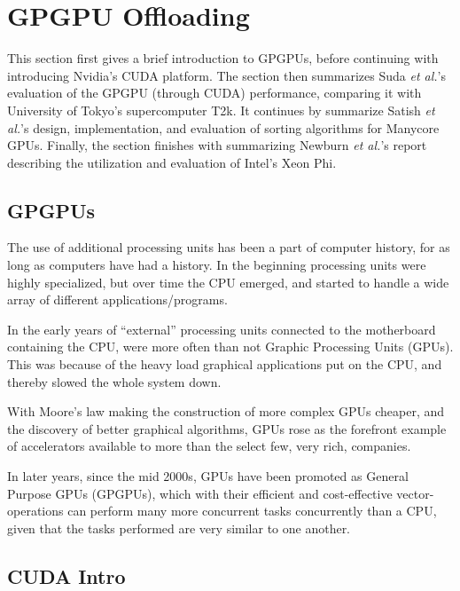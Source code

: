 
\section{GPGPU Offloading}
\label{sec:nvidia}

This section first gives a brief introduction to GPGPUs, before continuing with introducing Nvidia's CUDA platform.
The section then summarizes Suda \textit{et al.}'s\cite{Suda:2009:AGG:1509633.1509696} evaluation of the GPGPU (through CUDA) performance, comparing it with University of Tokyo's supercomputer T2k.
It continues by summarize Satish \textit{et al.}'s\cite{Satish:2009:DES:1586640.1587667} design, implementation, and evaluation of sorting algorithms for Manycore GPUs.
Finally, the section finishes with summarizing Newburn \textit{et al.}'s report describing the utilization and evaluation of Intel's Xeon Phi\texttrademark.

\subsection{GPGPUs}

The use of additional processing units has been a part of computer history, for as long as computers have had a history.
In the beginning processing units were highly specialized, but over time the CPU emerged, and started to handle a wide array of different applications/programs.

In the early years of ``external'' processing units connected to the motherboard containing the CPU, were more often than not Graphic Processing Units (GPUs).
This was because of the heavy load graphical applications put on the CPU, and thereby slowed the whole system down.

With Moore's law making the construction of more complex GPUs cheaper, and the discovery of better graphical algorithms, GPUs rose as the forefront example of accelerators available to more than the select few, very rich, companies.

In later years, since the mid 2000s, GPUs have been promoted as General Purpose GPUs (GPGPUs), which with their efficient and cost-effective vector-operations can perform many more concurrent tasks concurrently than a CPU, given that the tasks performed are very similar to one another.

\subsection{CUDA Intro}

